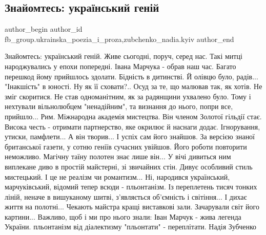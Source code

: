  
 
 
 
 
 
\subsection{Знайомтесь: український геній}
\label{sec:25_12_2022.fb.fb_group.ukrainska_poezia_i_proza.1.ukr_genij_marchuk}
 
\ifcmt
 author_begin
   author_id fb_group.ukrainska_poezia_i_proza,zubchenko_nadia.kyiv
 author_end
\fi

\obeycr
Знайомтесь: український геній.
Живе сьогодні, поруч, серед нас.
Такі митці народжувались у епохи попередні.
Івана Марчука - обрав наш час.
Багато перешкод йому прийшлось здолати.
Бідність в дитинстві. Й олівцю було, радів...
"Інакшість" в юності. Ну як її сховати?..
Осуд за те, що малював так, як хотів.
Не зміг скоритися. Не став одноманітним,
як за радянщини ухвалено було.
Тому і нехтували вільнолюбцем "ненадійним",
та визнання до нього, попри все, прийшло...
Рим. Міжнародна академія мистецтва.
Він членом Золотої гільдії стає.
Висока честь - отримати партнерство,
яке окрилює й наснаги додає.
Ігнорування, утиски, памфлети...
А він творив... І успіх сам його знайшов.
За версією знаної британської газети,
у сотню геніїв сучасних увійшов.
Його роботи повторити неможливо.
Магічну таїну полотен знає лише він...
У вічі дивиться ним виплекане диво
в простій майстерні, зі звичайних стін.
Дивує особливий стиль мистецький.
І це не реалізм чи романтизм...
Ні, народився український, марчуківський,
відомий тепер всюди - пльонтанізм.
Із переплетень тисяч тонких ліній,
неначе в вишуканому шитві,
з'являється об'ємність і світіння...
І дихає життя на полотні...
Чекають майстра кращі виставкові зали.
Зачарували світ його картини...
Важливо, щоб і ми про нього знали:
Іван Марчук - жива легенда України.
пльонтанізм від діалектизму "пльонтати" - переплітати.
\smallskip
Надія Зубченко
\restorecr

